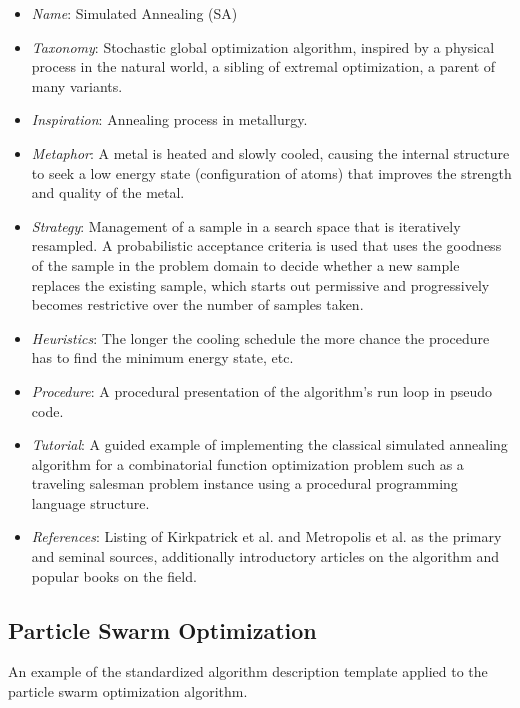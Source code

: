 \documentclass[a4paper, 11pt]{article}
\begin{document}
\begin{itemize}
	\item \emph{Name}: Simulated Annealing (SA)
	\item \emph{Taxonomy}: Stochastic global optimization algorithm, inspired by a physical process in the natural world, a sibling of extremal optimization, a parent of many variants. 
	\item \emph{Inspiration}: Annealing process in metallurgy. 
	\item \emph{Metaphor}: A metal is heated and slowly cooled, causing the internal structure to seek a low energy state (configuration of atoms) that improves the strength and quality of the metal. 
	\item \emph{Strategy}: Management of a sample in a search space that is iteratively resampled. A probabilistic acceptance criteria is used that uses the goodness of the sample in the problem domain to decide whether a new sample replaces the existing sample, which starts out permissive and progressively becomes restrictive over the number of samples taken. 
	\item \emph{Heuristics}: The longer the cooling schedule the more chance the procedure has to find the minimum energy state, etc.
	\item \emph{Procedure}: A procedural presentation of the algorithm's run loop in pseudo code.
	\item \emph{Tutorial}: A guided example of implementing the classical simulated annealing algorithm for a combinatorial function optimization problem such as a traveling salesman problem instance using a procedural programming language structure.
	\item \emph{References}: Listing of Kirkpatrick et al. and Metropolis et al. as the primary and seminal sources, additionally introductory articles on the algorithm and popular books on the field.
\end{itemize}

\subsection{Particle Swarm Optimization}
An example of the standardized algorithm description template applied to the particle swarm optimization algorithm.
\end{document}
